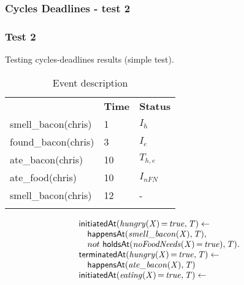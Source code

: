 \documentclass[8pt]{beamer}
\DeclareMathOperator{\val}{=}  %
\def \patsize {}
\def\happensAt{\textsf{\patsize happensAt}}
\def\holdsAt{\textsf{\patsize holdsAt}}
\def\initiatedAt{\textsf{\patsize initiatedAt}}
\def\terminatedAt{\textsf{\patsize terminatedAt}}
\newenvironment{mysplit}%
  {\arraycolsep 0pt \begin{array}{l}}%
  {\end{array}}
\begin{document}
\begin{frame}
    \frametitle{Cycles Deadlines - test 2}
    \subsubsection{Test 2}
    \small
    Testing cycles-deadlines results (simple test).\linebreak
    \begin{minipage}{0.4\linewidth}
        \begin{table}[t!]
            \caption{Event description}
            \begin{center}

                \begin{tabular}{lll}
                    \hline\noalign{\smallskip}
                    \multicolumn{1}{l}{\textbf{Event}} & \multicolumn{1}{c}{\textbf{Time}} & \multicolumn{1}{c}{\textbf{Status}} \\
                    smell\_bacon(chris)& 1 & $I_{h}$\\
                    found\_bacon(chris)& 3 & $I_{e}$\\
                    ate\_bacon(chris)& 10  & $T_{h,e}$\\
                    ate\_food(chris)& 10  & $I_{nFN}$\\
                    smell\_bacon(chris)& 12 & -\\
                    \noalign{\smallskip}
                    \hline
                \end{tabular}
            \end{center}
        \end{table}
    \end{minipage}
    \begin{minipage}{0.55\linewidth}
        \begin{align*}
            \begin{mysplit}
                \initiatedAt\mathit{(hungry(X)\val true,T)\leftarrow}\\
                \quad    \happensAt\mathit{(smell\_bacon(X),T),}\\
                \quad    not\ \holdsAt\mathit{(noFoodNeeds(X)\val true),T).}\\
                \terminatedAt\mathit{(hungry(X)\val true,T)\leftarrow}\\
                \quad    \happensAt\mathit{(ate\_bacon(X),T)}\\
                \initiatedAt\mathit{(eating(X)\val true,T)\leftarrow}\\

\end{mysplit}
\end{align*}
\end{minipage}
\end{frame}
\end{document}

